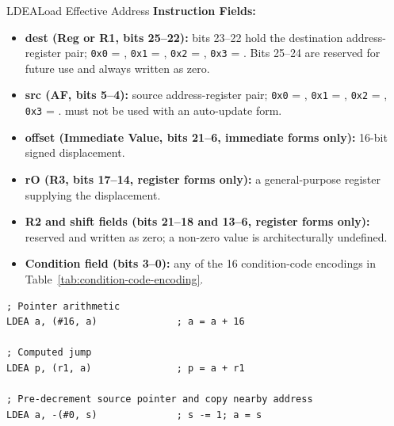 \begin{instructionbox}{LDEA}{Load Effective Address}
	\textbf{Instruction Fields:}
	\begin{itemize}
		\item \textbf{dest (Reg or R1, bits 25--22):} bits 23--22 hold the destination address-register pair;
		      \texttt{0x0} = , \texttt{0x1} = , \texttt{0x2} = , \texttt{0x3} = . Bits 25--24 are
		      reserved for future use and always written as zero.
		\item \textbf{src (AF, bits 5--4):} source address-register pair; \texttt{0x0} = , \texttt{0x1} =
		      , \texttt{0x2} = , \texttt{0x3} = \reg{p}.  must not be used with an auto-update form.
		\item \textbf{offset (Immediate Value, bits 21--6, immediate forms only):} 16-bit signed displacement.
		\item \textbf{rO (R3, bits 17--14, register forms only):} a general-purpose register supplying the displacement.
		\item \textbf{R2 and shift fields (bits 21--18 and 13--6, register forms only):} reserved and written as zero; a
		      non-zero value is architecturally undefined.
		\item \textbf{Condition field (bits 3--0):} any of the 16 condition-code encodings in
		      Table~\ref{tab:condition-code-encoding}.
	\end{itemize}

	\begin{example}
		\begin{lstlisting}
; Pointer arithmetic
LDEA a, (#16, a)              ; a = a + 16

; Computed jump
LDEA p, (r1, a)               ; p = a + r1

; Pre-decrement source pointer and copy nearby address
LDEA a, -(#0, s)              ; s -= 1; a = s
		\end{lstlisting}
		\caption{Pointer Arithmetic and Computed Jumps with LDEA}
	\end{example}
\end{instructionbox}

